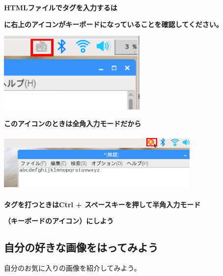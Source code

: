 \documentclass[a4paper,12pt]{jarticle}
\begin{document}
{\centering\bfseries
  HTMLファイルでタグを入力するは
  \par}

{\centering\bfseries
  に右上のアイコンがキーボードになっていることを確認してください。
  \par}

\centering
\includegraphics[width=7.301cm,height=3.976cm]{textbook-img159.png}





\bigskip

\bigskip

\bigskip

\bigskip


{\centering\bfseries
  このアイコンのときは全角入力モードだから
  \par}

\centering
\includegraphics[width=10.013cm,height=2.972cm]{textbook-img160.png}


\bigskip


\bigskip

{\centering\bfseries
  タグを打つときはCtrl +
  スペースキーを押して半角入力モード
  \par}

{\centering\bfseries
  （キーボードのアイコン）にしよう
  \par}

\clearpage
\flushleft
{}
\subsection{\theExercise 自分の好きな画像をはってみよう}
\addtocounter{Exercise}{-1}\label{E:embImginHTML}
自分のお気に入りの画像を紹介してみよう。
\end{document}
